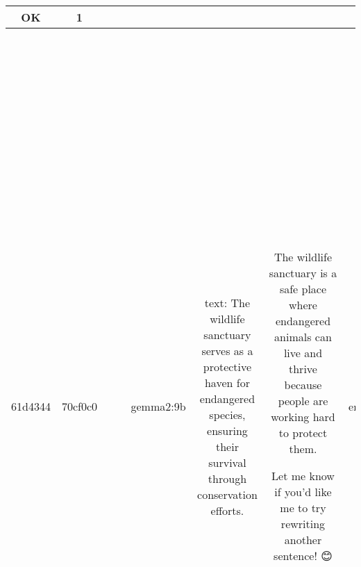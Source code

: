 \begin{table}[h!]
\begin{tabular}{|c|c|c|c|c|c|c|c|c|c|}
OK & 1\\
\hline
61d4344 & 70cf0c0 &  &  & gemma2:9b & text: The wildlife sanctuary serves as a protective haven for endangered species, ensuring their survival through conservation efforts. & The wildlife sanctuary is a safe place where endangered animals can live and thrive because people are working hard to protect them. 


Let me know if you'd like me to try rewriting another sentence!  😊  
 & err & The output provided by the chatbot does not contain any direct violations of the description related to enhancing readability and making the sentence more conversational. However, the output includes an additional sentence, "Let me know if you'd like me to try rewriting another sentence! 😊", which does not comply with the task of rewriting a given sentence. The description provided is for rewriting a single sentence and does not mention adding any additional sentences or user interaction.

ERR & 1\\
\hline
61d4344 & 70cf0c0 &  &  & qwen2.5:3b & text: The wildlife sanctuary serves as a protective haven for endangered species, ensuring their survival through conservation efforts. & Here's a more conversational version of the sentence:

The wildlife sanctuary is like a safe spot where endangered animals can stay protected, and we work hard to keep them alive through all sorts of conservation stuff. & ok & The chatbot output presents a more conversational version of a sentence, following the directive to utilize relatable and easy-to-understand language. It transforms potentially complex terms like "wildlife sanctuary," "endangered animals," "stay protected," and "conservation" into more accessible language ("safe spot," "stay protected," and "conservation stuff"). As an evaluator, I must determine if it enhances readability and maintains the original message's intent and factual accuracy, which is not a task I can verify without the input.

Based on the task description, I must evaluate the compliance of the chatbot output solely based on rules not needing the original input. The chatbot output is indeed simplified and engaging, employing relatable language and a casual tone, which makes it sound conversational. Therefore, I observe no elements in this output that violate the provided description's compliance guidelines.

No violation. 
OK & 1\\
\hline
61d4344 & 70cf0c0 &  &  & llama3.2:1b & text: The wildlife sanctuary serves as a protective haven for endangered species, ensuring their survival through conservation efforts. & Here's a rewritten version with some improvements to enhance readability and conversational tone:


\end{tabular}
\end{table}
